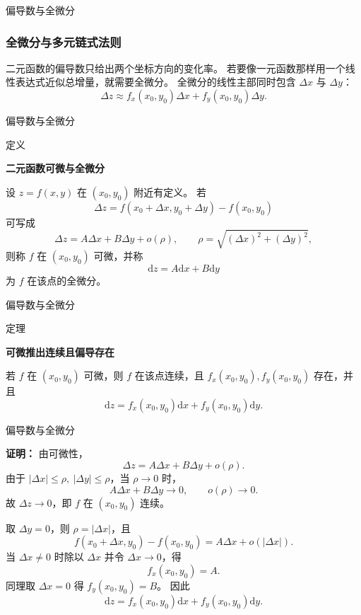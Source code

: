 \documentclass[aspectratio=169,10pt,fontset=fandol]{ctexbeamer}
\newcommand{\dd}{\mathrm{d}}
\begin{document}
\begin{frame}[t,fragile]{偏导数与全微分}
\normalsize
{\normalsize
\subsubsection*{全微分与多元链式法则}


}
{\normalsize
二元函数的偏导数只给出两个坐标方向的变化率。 若要像一元函数那样用一个线性表达式近似总增量，就需要全微分。 全微分的线性主部同时包含 $\Delta x$ 与 $\Delta y$：
\[
\Delta z\approx f_x(x_0,y_0)\Delta x+f_y(x_0,y_0)\Delta y.
\]


}
\end{frame}
\begin{frame}[t,fragile]{偏导数与全微分}
\normalsize
\begin{block}{定义}
{\normalsize
\textbf{二元函数可微与全微分}\par

设 $z=f(x,y)$ 在 $(x_0,y_0)$ 附近有定义。 若
\[
\Delta z=f(x_0+\Delta x,y_0+\Delta y)-f(x_0,y_0)
\]
可写成
\[
\Delta z=A\Delta x+B\Delta y+o(\rho),
\qquad \rho=\sqrt{(\Delta x)^2+(\Delta y)^2},
\]
则称 $f$ 在 $(x_0,y_0)$ 可微，并称
\[
\dd z=A\dd x+B\dd y
\]
为 $f$ 在该点的全微分。

}
\end{block}
\end{frame}
\begin{frame}[t,fragile]{偏导数与全微分}
\normalsize
\begin{block}{定理}
{\normalsize
\textbf{可微推出连续且偏导存在}\par

若 $f$ 在 $(x_0,y_0)$ 可微，则 $f$ 在该点连续，且 $f_x(x_0,y_0),f_y(x_0,y_0)$ 存在，并且
\[
\dd z=f_x(x_0,y_0)\dd x+f_y(x_0,y_0)\dd y.
\]

}
\end{block}
\end{frame}
\begin{frame}[t,fragile]{偏导数与全微分}
\footnotesize
{\footnotesize
\textbf{证明：}
由可微性，
\[
\Delta z=A\Delta x+B\Delta y+o(\rho).
\]
由于 $|\Delta x|\leq\rho,\ |\Delta y|\leq\rho$，当 $\rho\to0$ 时，
\[
A\Delta x+B\Delta y\to0,\qquad o(\rho)\to0.
\]
故 $\Delta z\to0$，即 $f$ 在 $(x_0,y_0)$ 连续。

取 $\Delta y=0$，则 $\rho=|\Delta x|$，且
\[
f(x_0+\Delta x,y_0)-f(x_0,y_0)=A\Delta x+o(|\Delta x|).
\]
当 $\Delta x\neq0$ 时除以 $\Delta x$ 并令 $\Delta x\to0$，得
\[
f_x(x_0,y_0)=A.
\]
同理取 $\Delta x=0$ 得 $f_y(x_0,y_0)=B$。 因此
\[
\dd z=f_x(x_0,y_0)\dd x+f_y(x_0,y_0)\dd y.
\]

}
\end{frame}
\end{document}
